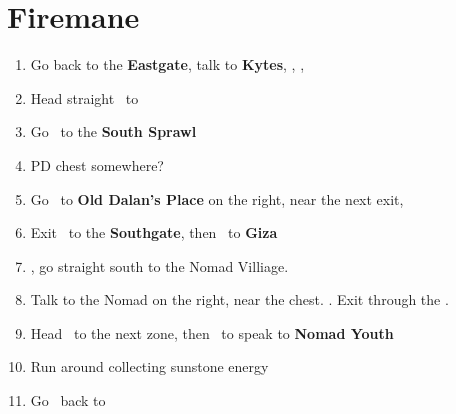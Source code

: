 \chapter{Firemane}
\begin{enumerate}
\item Go back to the \textbf{Eastgate}, talk to \textbf{Kytes}, \cs, \cs, \cs
\item Head straight \east\ to \lowtown
\item Go \south\ to the \textbf{South Sprawl}
\item PD chest somewhere?
\item Go \south\ to \textbf{Old Dalan's Place} on the right, near the next exit, \cs
\item Exit \south\ to the \textbf{Southgate}, then \south\ to \textbf{Giza}
\item \cs, go straight south to the Nomad Villiage.
\item Talk to the Nomad on the right, near the chest. \cs. Exit through the \south\west.
\item Head \south\ to the next zone, then \east\ to speak to \textbf{Nomad Youth}
\item Run around collecting sunstone energy
\item Go \north\ back to \rabanastre
\end{enumerate}

